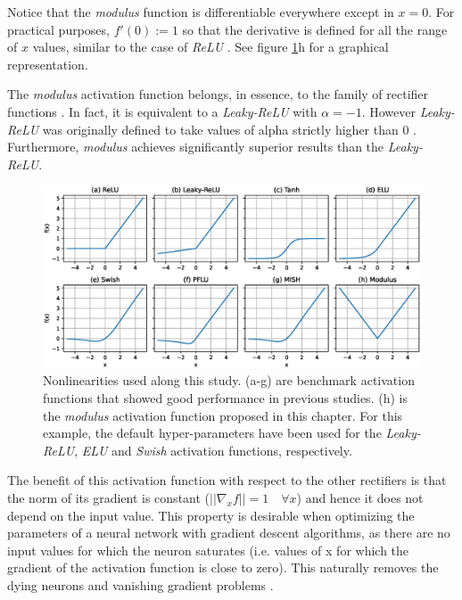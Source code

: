 Notice that the \textit{modulus} function is differentiable everywhere except in $x = 0$. For practical purposes,  $f'(0) := 1$  so that the derivative is defined for all the range of $x$ values, similar to the case of \textit{ReLU} \autocite{Goodfellow2016}. See figure \ref{fig:activations}h for a graphical representation.


The \textit{modulus} activation function belongs, in essence, to the family of rectifier functions \autocite{glorot2015} . In fact, it is equivalent to a \textit{Leaky-ReLU} with $\alpha=-1$. However \textit{Leaky-ReLU} was originally defined to take values of alpha strictly higher than 0 \autocite{xu2015}. Furthermore, \textit{modulus} achieves significantly superior results than the \textit{Leaky-ReLU}.

\begin{figure}[h!]
	\centering
	\includegraphics[width=1.0\linewidth]{modulus/images/activations}
	\caption[Nonlinearities compared with the \textit{modulus}]{Nonlinearities used along this study. (a-g) are benchmark activation functions that showed good performance in previous studies. (h) is the \textit{modulus} activation function proposed in this chapter. For this example, the default hyper-parameters have been used for the \textit{Leaky-ReLU}, \textit{ELU} and \textit{Swish} activation functions, respectively.
	}
	\label{fig:activations}
\end{figure}

The benefit of this activation function with respect to the other rectifiers is that the norm of its gradient is constant ($||\nabla_x f|| = 1 \quad \forall x$) and hence it does not depend on the input value. This property is desirable when optimizing the parameters of a neural network with gradient descent algorithms, as there are no input values for which the neuron saturates \autocite{glorot2010} (i.e. values of x for which the gradient of the activation function is close to zero). This naturally removes the dying neurons \autocite{lu2020} and vanishing gradient problems \autocite{pascanu13, hochreiter1998, Hochreiter2001}.

